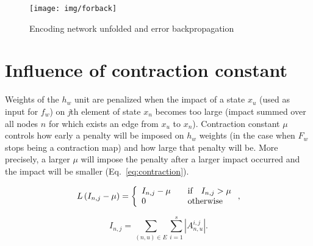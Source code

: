 \documentclass[]{spie}  %
\begin{document}
\begin{figure}
\begin{center}
	\texttt{[image: img/forback]}
	\caption{Encoding network unfolded and error backpropagation}
	\label{fig:forward}
	\label{fig:backward}
\end{center}
\end{figure}

\newpage
\section{Influence of contraction constant}
Weights of the $h_w$ unit are penalized when the impact of a state $x_u$ (used as input for $f_w$) on \emph{j}th element of state $x_n$ becomes too large (impact summed over all nodes $n$ for which exists an edge from $x_u$ to $x_n$). Contraction constant $\mu$ controls how early a penalty will be imposed on $h_w$ weights (in the case when $F_w$ stops being a contraction map) and how large that penalty will be. More precisely, a larger $\mu$ will impose the penalty after a larger impact occurred and the impact will be smaller (Eq.~\ref{eq:contraction}).

\begin{equation}
L\left(I_{n,j} - \mu\right) = \left\{
	\begin{array}{l l}
		I_{n,j} - \mu & \quad \text{if} \quad I_{n,j} > \mu \\
		0 & \quad \text{otherwise}
	\end{array} \right. ,
\label{eq:contraction}
\end{equation}

\begin{equation}
I_{n,j} = \sum_{(n, u) \in E} \sum_{i=1}^{s}|A_{n,u}^{i,j}|.
\end{equation}
\end{document}
